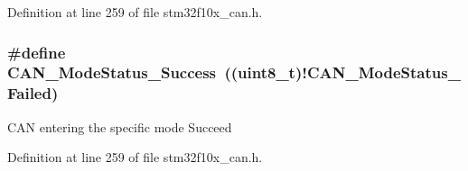 Definition at line 259 of file stm32f10x\+\_\+can.\+h.

\subsubsection[{\texorpdfstring{C\+A\+N\+\_\+\+Mode\+Status\+\_\+\+Success}{CAN_ModeStatus_Success}}]{\setlength{\rightskip}{0pt plus 5cm}\#define C\+A\+N\+\_\+\+Mode\+Status\+\_\+\+Success~(({\bf uint8\+\_\+t})!{\bf C\+A\+N\+\_\+\+Mode\+Status\+\_\+\+Failed})}\hypertarget{group___c_a_n___mode___status_ga7ca0ea503eb3b3a7c0abdfad27cb6579}{}\label{group___c_a_n___mode___status_ga7ca0ea503eb3b3a7c0abdfad27cb6579}
C\+AN entering the specific mode Succeed 

Definition at line 259 of file stm32f10x\+\_\+can.\+h.

